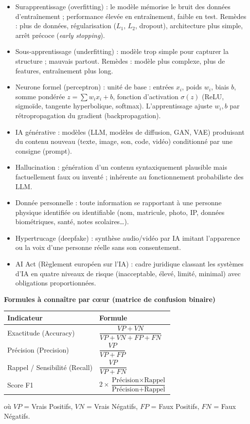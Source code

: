 \documentclass[11pt]{article}
\newcommand{\cle}[1]{{\popxbold\color{popdark}#1}}
\begin{document}
\begin{definition}
\begin{itemize}
  \item \cle{Surapprentissage (overfitting)} : le modèle mémorise le bruit des données d'entraînement ; performance élevée en entraînement, faible en test. Remèdes : plus de données, régularisation ($L_1$, $L_2$, dropout), architecture plus simple, arrêt précoce (\emph{early stopping}).
  \item \cle{Sous-apprentissage (underfitting)} : modèle trop simple pour capturer la structure ; mauvais partout. Remèdes : modèle plus complexe, plus de features, entraînement plus long.
  \item \cle{Neurone formel (perceptron)} : unité de base : entrées $x_i$, poids $w_i$, biais $b$, somme pondérée $z = \sum w_i x_i + b$, fonction d'activation $\sigma(z)$ (ReLU, sigmoïde, tangente hyperbolique, softmax). L'apprentissage ajuste $w_i, b$ par \cle{rétropropagation du gradient} (backpropagation).
  \item \cle{IA générative} : modèles (LLM, modèles de diffusion, GAN, VAE) produisant du contenu nouveau (texte, image, son, code, vidéo) conditionné par une \cle{consigne (prompt)}.
  \item \cle{Hallucination} : génération d'un contenu syntaxiquement plausible mais factuellement faux ou inventé ; inhérente au fonctionnement probabiliste des LLM.
  \item \cle{Donnée personnelle} : toute information se rapportant à une personne physique identifiée ou identifiable (nom, matricule, photo, IP, données biométriques, santé, notes scolaires…).
  \item \cle{Hypertrucage (deepfake)} : synthèse audio/vidéo par IA imitant l'apparence ou la voix d'une personne réelle sans son consentement.
  \item \cle{AI Act (Règlement européen sur l'IA)} : cadre juridique classant les systèmes d'IA en quatre niveaux de risque (inacceptable, élevé, limité, minimal) avec obligations proportionnées.
\end{itemize}

\textbf{Formules à connaître par cœur (matrice de confusion binaire)}

\begin{center}
\begin{tabularx}{\linewidth}{|l|X|}
\hline
\rowcolor{popblueL} \textbf{Indicateur} & \textbf{Formule} \\
\hline
Exactitude (Accuracy) & $\dfrac{VP + VN}{VP + VN + FP + FN}$ \\
\hline
Précision (Precision) & $\dfrac{VP}{VP + FP}$ \\
\hline
Rappel / Sensibilité (Recall) & $\dfrac{VP}{VP + FN}$ \\
\hline
Score F1 & $2 \times \dfrac{\text{Précision} \times \text{Rappel}}{\text{Précision} + \text{Rappel}}$ \\
\hline
\end{tabularx}
\end{center}
où $VP$ = Vrais Positifs, $VN$ = Vrais Négatifs, $FP$ = Faux Positifs, $FN$ = Faux Négatifs.


\end{definition}
\end{document}
